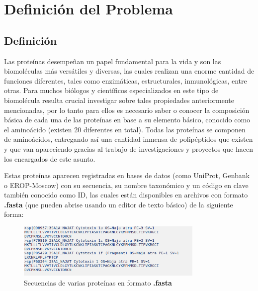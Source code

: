 \chapter{Definición del Problema}

\section{Definición}

Las proteínas desempeñan un papel fundamental para la vida y son las biomoléculas más versátiles y diversas, las cuales realizan una enorme cantidad de funciones diferentes, tales como enzimáticas, estructurales, inmunológicas, entre otras. Para muchos biólogos y científicos especializados en este tipo de biomolécula resulta crucial investigar sobre tales propiedades anteriormente mencionadas, por lo tanto para ellos es necesario saber o conocer la composición básica de cada una de las proteínas en base a su elemento básico, conocido como el aminoácido (existen 20 diferentes en total). Todas las proteínas se componen de aminoácidos, entregando así una cantidad inmensa de polipéptidos que existen y que van apareciendo gracias al trabajo de investigaciones y proyectos que hacen los encargados de este asunto.

Estas proteínas aparecen registradas en bases de datos (como UniProt, Genbank o EROP-Moscow) con su secuencia, su nombre taxonómico y un código en clave también conocido como ID, las cuales están disponibles en archivos con formato \textbf{.fasta} (que pueden abrise usando un editor de texto básico) de la siguiente forma:

\begin{figure}[ht]
    \centering
    \includegraphics[width=0.8\textwidth]{./images/secuencias.png}
    \caption{Secuencias de varias proteínas en formato \textbf{.fasta}}
    \label{fig:image4}
\end{figure}


